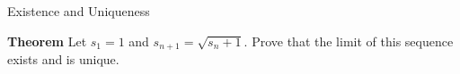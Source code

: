 Existence and Uniqueness



\textbf{Theorem}
Let $s_1=1$ and $s_{n+1}=\sqrt{s_n+1}$.  Prove that the limit of this sequence exists and is unique.

